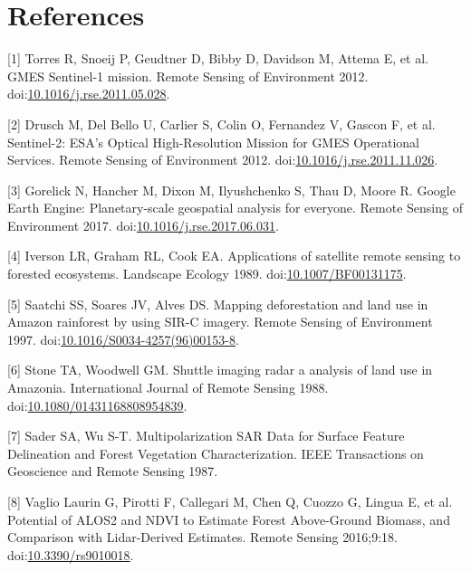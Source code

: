 \documentclass[]{elsarticle} %
\begin{document}
\hypertarget{references}{%
\section*{References}\label{references}}

\hypertarget{refs}{}
\leavevmode\hypertarget{ref-Torres2012}{}%
{[}1{]} Torres R, Snoeij P, Geudtner D, Bibby D, Davidson M, Attema E,
et al. GMES Sentinel-1 mission. Remote Sensing of Environment 2012.
doi:\href{https://doi.org/10.1016/j.rse.2011.05.028}{10.1016/j.rse.2011.05.028}.

\leavevmode\hypertarget{ref-Drusch2012}{}%
{[}2{]} Drusch M, Del Bello U, Carlier S, Colin O, Fernandez V, Gascon
F, et al. Sentinel-2: ESA's Optical High-Resolution Mission for GMES
Operational Services. Remote Sensing of Environment 2012.
doi:\href{https://doi.org/10.1016/j.rse.2011.11.026}{10.1016/j.rse.2011.11.026}.

\leavevmode\hypertarget{ref-Gorelick2017}{}%
{[}3{]} Gorelick N, Hancher M, Dixon M, Ilyushchenko S, Thau D, Moore R.
Google Earth Engine: Planetary-scale geospatial analysis for everyone.
Remote Sensing of Environment 2017.
doi:\href{https://doi.org/10.1016/j.rse.2017.06.031}{10.1016/j.rse.2017.06.031}.

\leavevmode\hypertarget{ref-Iverson1989}{}%
{[}4{]} Iverson LR, Graham RL, Cook EA. Applications of satellite remote
sensing to forested ecosystems. Landscape Ecology 1989.
doi:\href{https://doi.org/10.1007/BF00131175}{10.1007/BF00131175}.

\leavevmode\hypertarget{ref-Saatchi1997}{}%
{[}5{]} Saatchi SS, Soares JV, Alves DS. Mapping deforestation and land
use in Amazon rainforest by using SIR-C imagery. Remote Sensing of
Environment 1997.
doi:\href{https://doi.org/10.1016/S0034-4257(96)00153-8}{10.1016/S0034-4257(96)00153-8}.

\leavevmode\hypertarget{ref-Stone1988}{}%
{[}6{]} Stone TA, Woodwell GM. Shuttle imaging radar a analysis of land
use in Amazonia. International Journal of Remote Sensing 1988.
doi:\href{https://doi.org/10.1080/01431168808954839}{10.1080/01431168808954839}.

\leavevmode\hypertarget{ref-Sader1987}{}%
{[}7{]} Sader SA, Wu S-T. Multipolarization SAR Data for Surface Feature
Delineation and Forest Vegetation Characterization. IEEE Transactions on
Geoscience and Remote Sensing 1987.

\leavevmode\hypertarget{ref-VaglioLaurin2016}{}%
{[}8{]} Vaglio Laurin G, Pirotti F, Callegari M, Chen Q, Cuozzo G,
Lingua E, et al. Potential of ALOS2 and NDVI to Estimate Forest
Above-Ground Biomass, and Comparison with Lidar-Derived Estimates.
Remote Sensing 2016;9:18.
doi:\href{https://doi.org/10.3390/rs9010018}{10.3390/rs9010018}.
\end{document}
